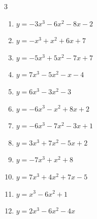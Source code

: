 \begin{multicols}{3}
\begin{enumerate}

  \item $y=-3x^{3}-6x^{2}-8x-2$


\columnbreak %

  \item $y=-x^{3}+x^{2}+6x+7$


  \item $y=-5x^{3}+5x^{2}-7x+7$


  \item $y=7x^{3}-5x^{2}-x-4$


  \item $y=6x^{3}-3x^{2}-3$


  \item $y=-6x^{3}-x^{2}+8x+2$


  \item $y=-6x^{3}-7x^{2}-3x+1$


  \item $y=3x^{3}+7x^{2}-5x+2$


  \item $y=-7x^{3}+x^{2}+8$


  \item $y=7x^{3}+4x^{2}+7x-5$


  \item $y=x^{3}-6x^{2}+1$


  \item $y=2x^{3}-6x^{2}-4x$



\end{enumerate}
\end{multicols}
